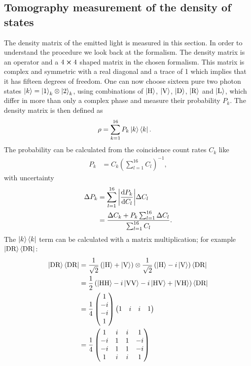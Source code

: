 \subsection{Tomography measurement of the density of states}
The density matrix of the emitted light is measured in this section.
In order to understand the procedure we look back at the formalism.
The density matrix is an operator and
a $4\cross 4$ shaped matrix in the chosen formalism.
This matrix is complex and symmetric with a real diagonal and a trace of 1 which implies that it has fifteen degrees of freedom.
One can now choose sixteen pure two photon states $\ket{k}=\ket{1}_k\otimes\ket{2}_k$, using combinations of $\left|\text{H}\right\rangle$, $\left|\text{V}\right\rangle$, $\left|\text{D}\right\rangle$, $\left|\text{R}\right\rangle$ and $\left|\text{L}\right\rangle$, which differ in more than only a complex phase and measure their probability $P_k$.
The density matrix is then defined as
\begin{align}
\rho
    &=\sum_{k=1}^{16}P_k\ket{k}\bra{k}.
    \label{eq:a:rho}
\end{align}
The probability can be calculated from the coincidence count rates $C_k$ like
\begin{align}
P_k
    &=C_k \left(\sum_{l=1}^{16}C_l\right)^{-1},
    \label{eq:a:Pk}
\end{align}
with uncertainty
\begin{subequations}
\label{eq:a:dP}
\begin{align}
\Delta P_k
    &=\sum_{l=1}^{16}\abs{\frac{\dd P_k}{\dd C_l}}\Delta C_l
    \label{eq:a:dP:1}\\
    &=\frac{\Delta C_k+P_k\sum_{l=1}^{16}\Delta C_l}{\sum_{l=1}^{16}C_l}.
    \label{eq:a:dP:2}
\end{align}
\end{subequations}
The $\ket{k}\bra{k}$ term can be calculated with a matrix multiplication; for example $\left|\text{DR}\right\rangle\left\langle\text{DR}\right|$:
\begin{subequations}
\label{eq:a:DR}
\begin{align}
\left|\text{DR}\right\rangle\left\langle\text{DR}\right|
    &=\frac{1}{\sqrt{2}}\left(\left|\text{H}\right\rangle+\left|\text{V}\right\rangle\right) \otimes \frac{1}{\sqrt{2}}\left(\left|\text{H}\right\rangle-i\left|\text{V}\right\rangle\right) \left\langle\text{DR}\right|
    \label{eq:a:DR:1}\\
    &=\frac{1}{2}\left(\left|\text{HH}\right\rangle-i\left|\text{VV}\right\rangle-i\left|\text{HV}\right\rangle+\left|\text{VH}\right\rangle\right) \left\langle\text{DR}\right|
    \label{eq:a:DR:2}\\
    &=\frac{1}{4}
    \begin{pmatrix}1\\-i\\-i\\1\end{pmatrix}
    \begin{pmatrix}1&i&i&1\end{pmatrix}
    \label{eq:a:DR:3}\\
    &=\frac{1}{4}\begin{pmatrix}
    1   &i  &i  &1\\
    -i  &1  &1  &-i\\
    -i  &1  &1  &-i\\
    1   &i  &i  &1
    \end{pmatrix}
\end{align}
\end{subequations}
